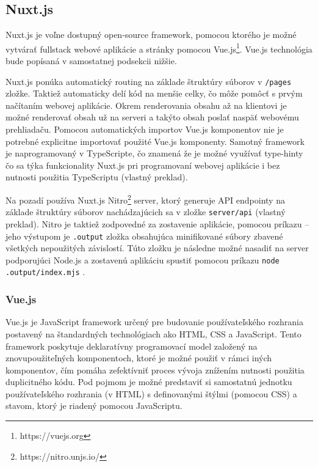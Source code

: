 \subsection {Nuxt.js}
Nuxt.js je voľne dostupný open-source framework, pomocou ktorého je možné vytvárať fullstack webové aplikácie a stránky pomocou Vue.js\footnote{https://vuejs.org}. Vue.js technológia bude popísaná v samostatnej podsekcii nižšie.

Nuxt.js ponúka automatický routing na základe štruktúry súborov v \newline \texttt{/pages} zložke. Taktiež automaticky delí kód na menšie celky, čo môže pomôcť s prvým načítaním webovej aplikácie. Okrem renderovania obsahu až na klientovi je možné renderovať obsah už na serveri a takýto obsah poslať naspäť webovému prehliadaču. Pomocou automatických importov Vue.js komponentov nie je potrebné explicitne importovať použité Vue.js komponenty. Samotný framework je naprogramovaný v TypeScripte, čo znamená že je možné využívať type-hinty čo sa týka funkcionality Nuxt.js pri programovaní webovej aplikácie i bez nutnosti použitia TypeScriptu \cite{nuxt_introduction} (vlastný preklad).

Na pozadí používa Nuxt.js Nitro\footnote{https://nitro.unjs.io/} server, ktorý generuje API endpointy na základe štruktúry súborov nachádzajúcich sa v zložke \texttt{server/api} \cite{nuxt_introduction} (vlastný preklad). Nitro je taktiež zodpovedné za zostavenie  aplikácie, pomocou príkazu  -- jeho výstupom je \texttt{.output} zložka obsahujúca minifikované súbory zbavené všetkých nepoužitých závislostí. Túto zložku je následne možné nasadiť na server podporujúci Node.js a zostavenú aplikáciu spustiť pomocou príkazu \texttt{node .output/index.mjs} .

\subsubsection {Vue.js}
Vue.js je JavaScript framework určený pre budovanie používateľského rozhrania postavený na štandardných technológiach ako HTML, CSS a JavaScript. Tento framework poskytuje deklaratívny programovací model založený na znovupoužiteľných komponentoch, ktoré je možné použiť v rámci iných komponentov, čím pomáha zefektívniť proces vývoja znížením nutnosti použitia duplicitného kódu. Pod pojmom  je možné predstaviť si samostatnú jednotku používateľského rozhrania (v HTML) s definovanými štýlmi (pomocou CSS) a stavom, ktorý je riadený pomocou JavaScriptu.

